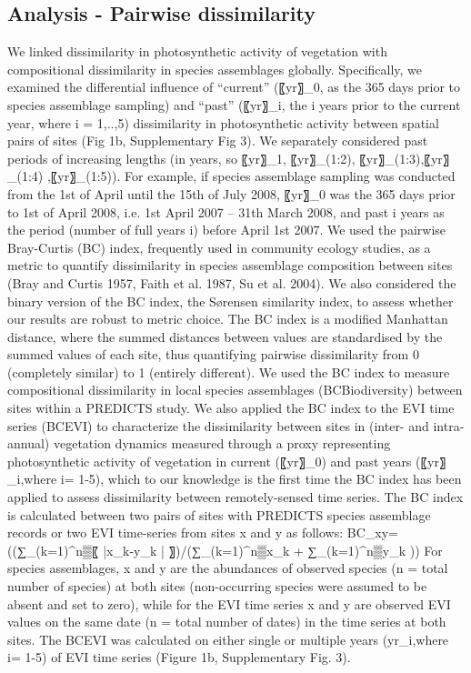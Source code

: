 {\subsection{Analysis - Pairwise dissimilarity}
We linked dissimilarity in photosynthetic activity of vegetation with compositional dissimilarity in species assemblages globally. Specifically, we examined the differential influence of “current” (〖yr〗_0, as the 365 days prior to species assemblage sampling) and “past” (〖yr〗_i, the i years prior to the current year, where i = 1,..,5) dissimilarity in photosynthetic activity between spatial pairs of sites (Fig 1b, Supplementary Fig 3). We separately considered past periods of increasing lengths (in years, so 〖yr〗_1, 〖yr〗_(1:2), 〖yr〗_(1:3),〖yr〗_(1:4)  ,〖yr〗_(1:5)). For example, if species assemblage sampling was conducted from the 1st of April until the 15th of July 2008, 〖yr〗_0 was the 365 days prior to 1st of April 2008, i.e. 1st April 2007 – 31th March 2008, and past i years as the period (number of full years i) before April 1st 2007.
	We used the pairwise Bray-Curtis (BC) index, frequently used in community ecology studies, as a metric to quantify dissimilarity in species assemblage composition between sites (Bray and Curtis 1957, Faith et al. 1987, Su et al. 2004). We also considered the binary version of the BC index, the Sørensen similarity index, to assess whether our results are robust to metric choice. The BC index is a modified Manhattan distance, where the summed distances between values are standardised by the summed values of each site, thus quantifying pairwise dissimilarity from 0 (completely similar) to 1 (entirely different). We used the BC index to measure compositional dissimilarity in local species assemblages (BCBiodiversity) between sites within a PREDICTS study. We also applied the BC index to the EVI time series (BCEVI) to characterize the dissimilarity between sites in (inter- and intra-annual) vegetation dynamics measured through a proxy representing photosynthetic activity of vegetation in current (〖yr〗_0) and past years (〖yr〗_i,where i= 1-5), which to our knowledge is the first time the BC index has been applied to assess dissimilarity between remotely-sensed time series.
	The BC index is calculated between two pairs of sites with PREDICTS species assemblage records or two EVI time-series from sites x and y as follows: 
BC_xy=((∑_(k=1)^n▒〖 |x_k-y_k  | 〗)/(∑_(k=1)^n▒x_k + ∑_(k=1)^n▒y_k ))
For species assemblages, x and y are the abundances of observed species (n = total number of species) at both sites (non-occurring species were assumed to be absent and set to zero), while for the EVI time series x and y are observed EVI values on the same date (n = total number of dates) in the time series at both sites. The BCEVI was calculated on either single or multiple years (yr_i,where i= 1-5) of EVI time series (Figure 1b, Supplementary Fig. 3).
}
